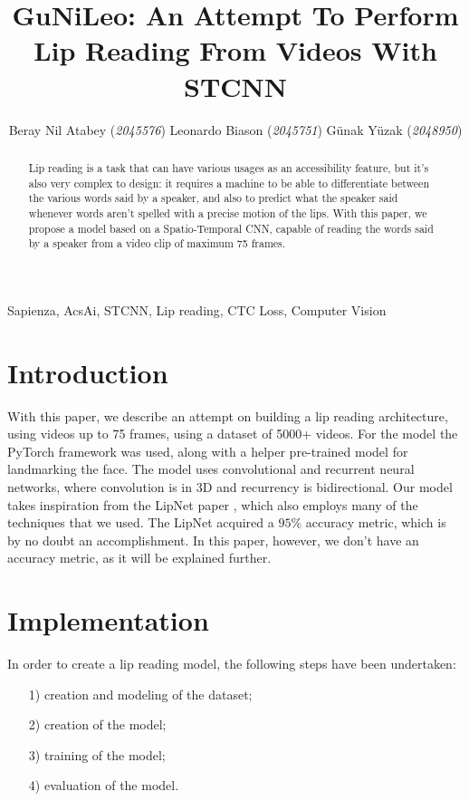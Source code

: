 \documentclass[11pt,journal]{IEEEtran}
\title{GuNiLeo: An Attempt To Perform Lip Reading From Videos With STCNN}
\author{Beray Nil Atabey (\textit{2045576}) \quad Leonardo Biason (\textit{2045751}) \quad Günak Yüzak (\textit{2048950})}
\begin{document}
\maketitle

\begin{abstract}
    Lip reading is a task that can have various usages as an accessibility feature, but it's also very complex to design: it requires a machine to be able to differentiate between the various words said by a speaker, and also to predict what the speaker said whenever words aren't spelled with a precise motion of the lips. With this paper, we propose a model based on a Spatio-Temporal CNN, capable of reading the words said by a speaker from a video clip of maximum 75 frames.
\end{abstract}

\begin{keywords}
    Sapienza, AcsAi, STCNN, Lip reading, CTC Loss, Computer Vision 
\end{keywords}

\section{Introduction}

With this paper, we describe an attempt on building a lip reading architecture, using videos up to 75 frames, using a dataset of 5000+ videos. For the model the PyTorch framework was used, along with a helper pre-trained model for landmarking the face. The model uses convolutional and recurrent neural networks, where convolution is in 3D and recurrency is bidirectional.
Our model takes inspiration from the LipNet paper \cite{lipnet}, which also employs many of the techniques that we used. The LipNet acquired a $95\%$ accuracy metric, which is by no doubt an accomplishment. In this paper, however, we don't have an accuracy metric, as it will be explained further.

 
\section{Implementation }

In order to create a lip reading model, the following steps have been undertaken:
\begin{itemize}
    \item [1)] creation and modeling of the dataset;
    \item [2)] creation of the model;
    \item [3)] training of the model;
    \item [4)] evaluation of the model.
\end{itemize}
\end{document}
